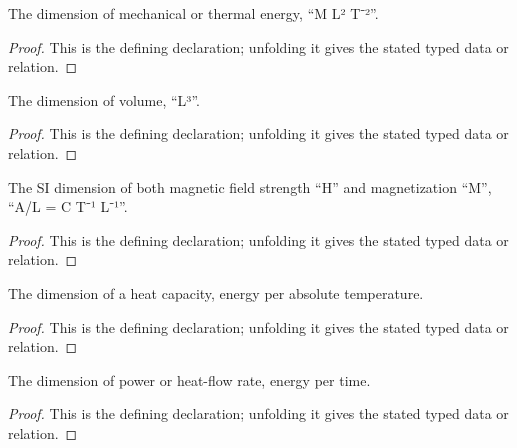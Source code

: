 \begin{definition}[energyDimension]
  \label{decl:physics:IPhO_2026_3_C_4:energyDimension}
  The dimension of mechanical or thermal energy, “M L² T⁻²”.
\end{definition}
\begin{proof}
  This is the defining declaration; unfolding it gives the stated typed data or relation.
\end{proof}

\begin{definition}[volumeDimension]
  \label{decl:physics:IPhO_2026_3_C_4:volumeDimension}
  The dimension of volume, “L³”.
\end{definition}
\begin{proof}
  This is the defining declaration; unfolding it gives the stated typed data or relation.
\end{proof}

\begin{definition}[magneticIntensityDimension]
  \label{decl:physics:IPhO_2026_3_C_4:magneticIntensityDimension}
  The SI dimension of both magnetic field strength “H” and magnetization “M”, “A/L = C T⁻¹ L⁻¹”.
\end{definition}
\begin{proof}
  This is the defining declaration; unfolding it gives the stated typed data or relation.
\end{proof}

\begin{definition}[heatCapacityDimension]
  \label{decl:physics:IPhO_2026_3_C_4:heatCapacityDimension}
  The dimension of a heat capacity, energy per absolute temperature.
\end{definition}
\begin{proof}
  This is the defining declaration; unfolding it gives the stated typed data or relation.
\end{proof}

\begin{definition}[powerDimension]
  \label{decl:physics:IPhO_2026_3_C_4:powerDimension}
  The dimension of power or heat-flow rate, energy per time.
\end{definition}
\begin{proof}
  This is the defining declaration; unfolding it gives the stated typed data or relation.
\end{proof}

